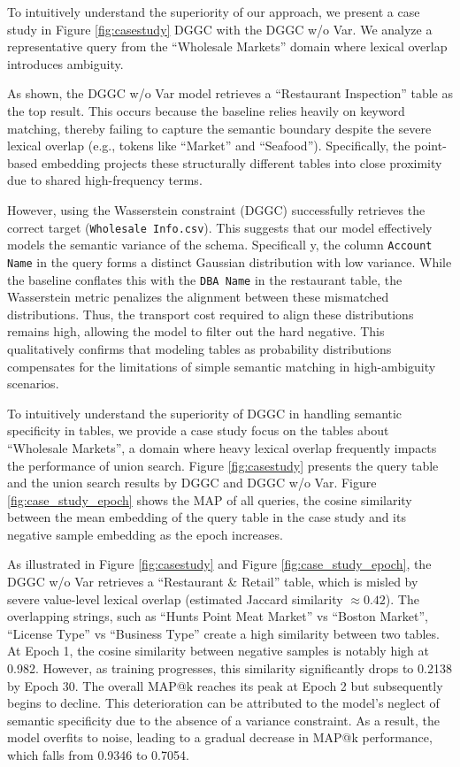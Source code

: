 To intuitively understand the superiority of our approach, we present a case study in Figure \ref{fig:casestudy} DGGC with the DGGC w/o Var. We analyze a representative query from the ``Wholesale Markets'' domain where lexical overlap introduces ambiguity.

As shown, the DGGC w/o Var model retrieves a ``Restaurant Inspection'' table as the top result. This occurs because the baseline relies heavily on keyword matching, thereby failing to capture the semantic boundary despite the severe lexical overlap (e.g., tokens like ``Market'' and ``Seafood''). Specifically, the point-based embedding projects these structurally different tables into close proximity due to shared high-frequency terms.



However, using the Wasserstein constraint (DGGC) successfully retrieves the correct target (\texttt{Wholesale Info.csv}). This suggests that our model effectively models the semantic variance of the schema. Specificall  y, the column \texttt{Account Name} in the query forms a distinct Gaussian distribution with low variance. While the baseline conflates this with the \texttt{DBA Name} in the restaurant table, the Wasserstein metric penalizes the alignment between these mismatched distributions. Thus, the transport cost \cite{peyre2019computational} required to align these distributions remains high, allowing the model to filter out the hard negative. This qualitatively confirms that modeling tables as probability distributions compensates for the limitations of simple semantic matching in high-ambiguity scenarios.



To intuitively understand the superiority of DGGC in handling semantic specificity in tables, we provide a case study focus on the tables about ``Wholesale Markets'', a domain where heavy lexical overlap frequently impacts the performance of union search. Figure \ref{fig:casestudy} presents the query table and the union search results by DGGC and DGGC w/o Var. Figure \ref{fig:case_study_epoch} shows the MAP of all queries, the cosine similarity between the mean embedding of the query table in the case study and its negative sample embedding as the epoch increases.

As illustrated in Figure \ref{fig:casestudy} and Figure \ref{fig:case_study_epoch}, the DGGC w/o Var retrieves a ``Restaurant \& Retail'' table, which is misled by severe value-level lexical overlap (estimated Jaccard similarity $\approx 0.42$). The overlapping strings, such as ``Hunts Point Meat Market'' vs ``Boston Market'', ``License Type'' vs ``Business Type'' create a high similarity between two tables. At Epoch 1, the cosine similarity between negative samples is notably high at 0.982. However, as training progresses, this similarity significantly drops to 0.2138 by Epoch 30. The overall MAP@k reaches its peak at Epoch 2 but subsequently begins to decline. This deterioration can be attributed to the model's neglect of semantic specificity due to the absence of a variance constraint. As a result, the model overfits to noise, leading to a gradual decrease in MAP@k performance, which falls from 0.9346 to 0.7054.

